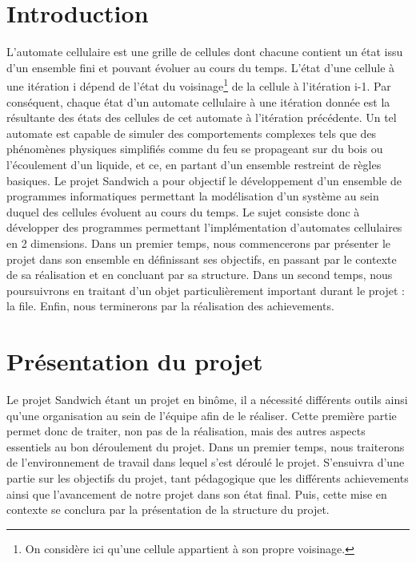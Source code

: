 \documentclass[a4paper]{article}
\begin{document}
\tableofcontents

\newpage
\section*{Introduction}
L'automate cellulaire est une grille de cellules dont chacune contient un état issu d'un ensemble fini et pouvant évoluer au cours du temps. L'état d'une cellule à une itération i dépend de l'état du voisinage\footnote{On considère ici qu'une cellule appartient à son propre voisinage.} de la cellule à l'itération i-1. Par conséquent, chaque état d'un automate cellulaire à une itération donnée est la résultante des états des cellules de cet automate à l'itération précédente. Un tel automate est capable de simuler des comportements complexes tels que des phénomènes physiques simplifiés comme du feu se propageant sur du bois ou l'écoulement d'un liquide, et ce, en partant d'un ensemble restreint de règles basiques.
Le projet Sandwich a pour objectif le développement  d'un ensemble de programmes informatiques permettant la modélisation d'un système au sein duquel des cellules évoluent au cours du temps. Le sujet consiste donc à développer des programmes permettant l'implémentation d'automates cellulaires en 2 dimensions. 
Dans un premier temps, nous commencerons par présenter le projet dans son ensemble en définissant ses objectifs, en passant par le contexte de sa réalisation et en concluant par sa structure. Dans un second temps, nous poursuivrons en traitant d'un objet particulièrement important durant le projet : la file. Enfin, nous terminerons par la réalisation des achievements.
\newpage

\section{Présentation du projet}
Le projet Sandwich étant un projet en binôme, il a nécessité différents outils ainsi qu'une organisation au sein de l'équipe afin de le réaliser. Cette première partie permet donc de traiter, non pas de la réalisation, mais des autres aspects essentiels au bon déroulement du projet. Dans un premier temps, nous traiterons de l'environnement de travail dans lequel s'est déroulé le projet. S'ensuivra d'une partie sur les objectifs du projet, tant pédagogique que les différents achievements ainsi que l'avancement de notre projet dans son état final. Puis, cette mise en contexte se conclura par la présentation de la structure du projet.
\vspace{0.3cm}
\end{document}
